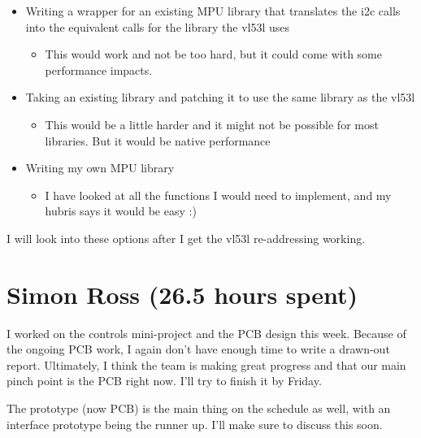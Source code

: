 \documentclass[12pt, titlepage]{article}
\begin{document}
\begin{itemize}
\item Writing a wrapper for an existing MPU library that translates the i2c calls into the equivalent calls for the library the vl53l uses
   \begin{itemize}
   \item	This would work and not be too hard, but it could come with some performance impacts. 
   \end{itemize}
\item Taking an existing library and patching it to use the same library as the vl53l
   \begin{itemize}
   \item This would be a little harder and it might not be possible for most libraries. But it would be native performance
   \end{itemize}
\item Writing my own MPU library
   \begin{itemize}
   \item I have looked at all the functions I would need to implement, and my hubris says it would be easy :) 
   \end{itemize}
\end{itemize}

I will look into these options after I get the vl53l re-addressing working. 

\section*{Simon Ross (26.5 hours spent)}

I worked on the controls mini-project and the PCB design this week. Because of the ongoing PCB work, I again don't have enough time to write a drawn-out report. Ultimately, I think the team is making great progress and that our main pinch point is the PCB right now. I'll try to finish it by Friday.

The prototype (now PCB) is the main thing on the schedule as well, with an interface prototype being the runner up. I'll make sure to discuss this soon.
\end{document}
